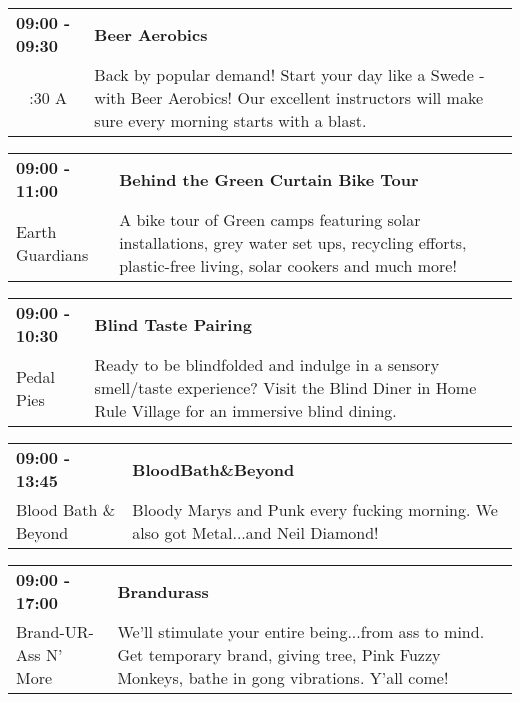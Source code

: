 \begin{tabular}{ p{1in} p{2.2in} }
    \textbf{09:00 - 09:30} & \textbf{Beer Aerobics} \\
    ~ \newline 4:30 A & Back by popular demand! Start your day like a Swede - with Beer Aerobics! Our excellent instructors will make sure every morning starts with a blast. \\
    \hline 
\end{tabular}
    
\begin{tabular}{ p{1in} p{2.2in} }
    \textbf{09:00 - 11:00} & \textbf{Behind the Green Curtain Bike Tour} \\
    Earth Guardians \newline  & A bike tour of  Green camps featuring solar installations, grey water set ups, recycling efforts, plastic-free living, solar cookers and much more! \\
    \hline 
\end{tabular}
    
\begin{tabular}{ p{1in} p{2.2in} }
    \textbf{09:00 - 10:30} & \textbf{Blind Taste Pairing} \\
    Pedal Pies \newline  & Ready to be blindfolded and indulge in a sensory smell/taste experience? Visit the Blind Diner in Home Rule Village for an immersive blind dining. \\
    \hline 
\end{tabular}
    
\begin{tabular}{ p{1in} p{2.2in} }
    \textbf{09:00 - 13:45} & \textbf{BloodBath\&Beyond} \\
    Blood Bath \& Beyond \newline  & Bloody Marys and Punk every fucking morning. We also got Metal...and Neil Diamond! \\
    \hline 
\end{tabular}
    
\begin{tabular}{ p{1in} p{2.2in} }
    \textbf{09:00 - 17:00} & \textbf{Brandurass} \\
    Brand-UR-Ass N' More \newline  & We'll stimulate your entire being...from ass to mind. Get temporary brand, giving tree, Pink Fuzzy Monkeys, bathe in gong vibrations. Y'all come! \\
    \hline 
\end{tabular}
    
